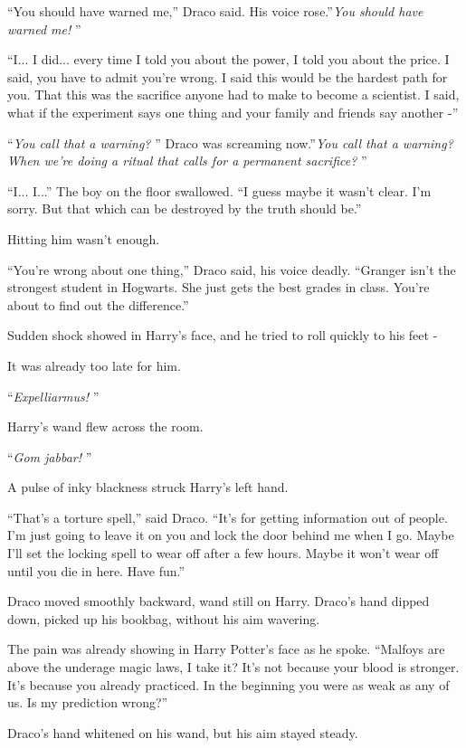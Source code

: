 ``You should have warned me,'' Draco said. His voice rose.''\emph{You
should have warned me!} ''

``I... I did... every time I told you about the power, I told
you about the price. I said, you have to admit you're wrong. I said this
would be the hardest path for you. That this was the sacrifice anyone
had to make to become a scientist. I said, what if the experiment says
one thing and your family and friends say another -''

``\emph{You call that a warning?} '' Draco was screaming now.''\emph{You
call that a warning? When we're doing a ritual that calls for a
permanent sacrifice?} ''

``I... I...'' The boy on the floor swallowed. ``I guess maybe
it wasn't clear. I'm sorry. But that which can be destroyed by the truth
should be.''

Hitting him wasn't enough.

``You're wrong about one thing,'' Draco said, his voice deadly.
``Granger isn't the strongest student in Hogwarts. She just gets the
best grades in class. You're about to find out the difference.''

Sudden shock showed in Harry's face, and he tried to roll quickly to his
feet -

It was already too late for him.

``\emph{Expelliarmus!} ''

Harry's wand flew across the room.

``\emph{Gom jabbar!} ''

A pulse of inky blackness struck Harry's left hand.

``That's a torture spell,'' said Draco. ``It's for getting information
out of people. I'm just going to leave it on you and lock the door
behind me when I go. Maybe I'll set the locking spell to wear off after
a few hours. Maybe it won't wear off until you die in here. Have fun.''

Draco moved smoothly backward, wand still on Harry. Draco's hand dipped
down, picked up his bookbag, without his aim wavering.

The pain was already showing in Harry Potter's face as he spoke.
``Malfoys are above the underage magic laws, I take it? It's not because
your blood is stronger. It's because you already practiced. In the
beginning you were as weak as any of us. Is my prediction wrong?''

Draco's hand whitened on his wand, but his aim stayed steady.

